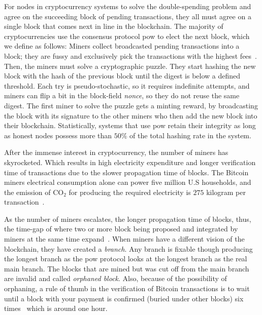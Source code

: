 For nodes in cryptocurrency systems to solve the double-spending problem and agree on the succeeding block of pending transactions, they all must agree on a single block that comes next in line in the blockchain. The majority of cryptocurrencies use the consensus protocol \ac{pow} to elect the next block, which we define as follows: Miners collect broadcasted pending transactions into a block; they are fussy and exclusively pick the transactions with the highest fees~\cite{trends_fee, trans_fee}. Then, the miners must solve a cryptographic puzzle. They start hashing the new block with the hash of the previous block until the digest is below a defined threshold. Each try is pseudo-stochastic, so it requires indefinite attempts, and miners can flip a bit in the block-field \emph{nonce}, so they do not reuse the same digest. The first miner to solve the puzzle gets a minting reward, by broadcasting the block with its signature to the other miners who then add the new block into their blockchain. Statistically, systems that use \ac{pow} retain their integrity as long as honest nodes possess more than $50\%$ of the total hashing rate in the system.

After the immense interest in cryptocurrency, the number of miners has skyrocketed. Which results in high electricity expenditure and longer verification time of transactions due to the slower propagation time of blocks. The Bitcoin miners electrical consumption alone can power five million U.S households, and the emission of CO$_2$ for producing the required electricity is $275$ kilogram per transaction~\cite{bitcoin_power}.

As the number of miners escalates, the longer propagation time of blocks, thus, the time-gap of where two or more block being proposed and integrated by miners at the same time expand~\cite{trans_fee}. When miners have a different vision of the blockchain, they have created a \emph{branch}. Any branch is fixable though producing the longest branch as the \ac{pow} protocol looks at the longest branch as the real main branch. The blocks that are mined but was cut off from the main branch are invalid and called \emph{orphaned block}. Also, because of the possibility of orphaning, a rule of thumb in the verification of Bitcoin transactions is to wait until a block with your payment is confirmed (buried under other blocks) six times~\cite{bitcoin_verification_1, bitcoin_verification_2} which is around one hour.

\newpage
